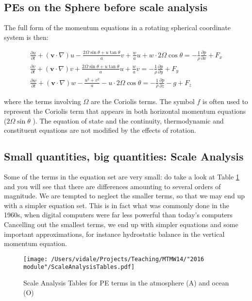 \subsection{PEs on the Sphere before scale analysis}

The full form of the momentum equations in a rotating spherical coordinate system is then:

\begin{eqnarray}
	\frac {\partial u}{\partial t} + \left(\mathbf{v}\cdot\nabla\right)u - \frac{2 \Omega \sin \theta + u \tan \theta}{a} v  + \frac{w}{a}u + w \cdot 2 \Omega \cos \theta =-\frac{1}{\rho} \frac{\partial p}{\partial x}+F_x \\
	\frac {\partial v}{\partial t} + \left(\mathbf{v}\cdot\nabla\right)v + \frac{2 \Omega \sin \theta +u \tan \theta}{a} u  + \frac{w}{a}v =-\frac{1}{\rho} \frac{\partial p}{\partial y}+F_y \\
	\frac {\partial w}{\partial t} + \left(\mathbf{v}\cdot\nabla\right)w - \frac{u^2 + v^2}{a} - u \cdot 2 \Omega \cos \theta =-\frac{1}{\rho} \frac{\partial p}{\partial z}-g+F_z
\end{eqnarray}

where the terms involving $\Omega$ are the Coriolis terms. The symbol $f$ is often used to represent the Coriolis term that appears in both horizontal momentum equations ($2 \Omega \sin \theta$ ). The equation of state and the continuity, thermodynamic and constituent equations are not modified by the effects of rotation.

\subsection{Small quantities, big quantities: Scale Analysis}

Some of the terms in the equation set are very small: do take a look at Table \ref{fig:Scale-Analysis-Tables} and you will see that there are differences amounting to several orders of magnitude. We are tempted to neglect the smaller terms, so that we may end up with a simpler equation set. This is in fact what  was commonly done  in the 1960s, when digital computers were far less powerful than today's computers
Cancelling out the smallest terms, we end up with simpler equations and some important approximations, for instance hydrostatic balance in the vertical momentum equation.

\begin{figure}[h!]
		\begin{center}
	\texttt{[image: /Users/vidale/Projects/Teaching/MTMW14/"2016 module"/ScaleAnalysisTables.pdf]}
		\end{center}
	\caption{Scale Analysis Tables for PE terms in the atmosphere (A) and ocean (O)}
		\label{fig:Scale-Analysis-Tables}
\end{figure}

